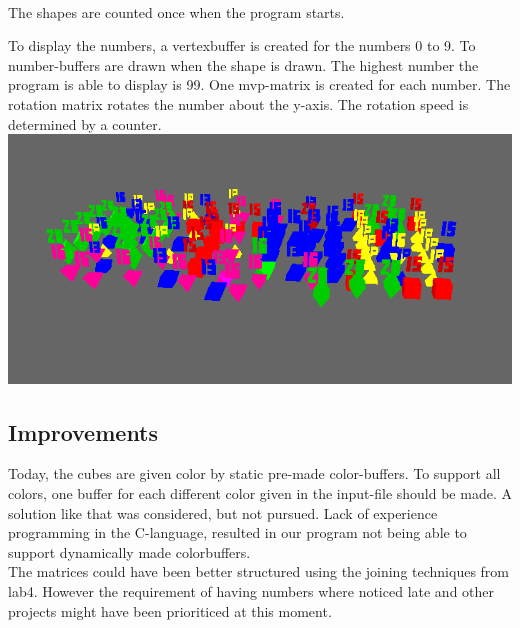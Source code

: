 \\
The shapes are counted once when the program starts. 

To display the numbers, a vertexbuffer is created for the numbers 0 to 9. To number-buffers are drawn when the shape is drawn. The highest number the program is able to display is 99. One mvp-matrix is created for each number. The rotation matrix rotates the number about the y-axis. The rotation speed is determined by a counter. 
\\
\includegraphics[scale=0.75]{with_numbers.png}
\\

\subsection{Improvements}
Today, the cubes are given color by static pre-made color-buffers. 
To support all colors, one buffer for each different color given in the input-file should be made. 
A solution like that was considered, but not pursued.
Lack of experience programming in the C-language, resulted in our program not being able to support dynamically made colorbuffers.
\\
The matrices could have been better structured using the joining techniques from lab4. However the requirement of having numbers where noticed late and other projects might have been prioriticed at this moment. 

